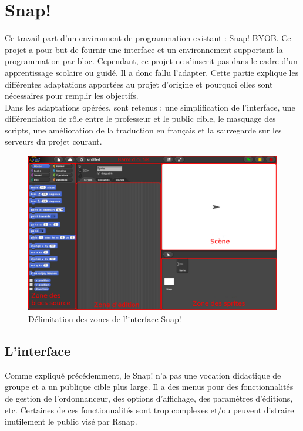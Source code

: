 \section{Snap!}
\label{solution SNAP}
Ce travail part d'un environnent de programmation existant : Snap! BYOB. Ce projet a pour but de fournir une interface et un environnement supportant la programmation par bloc. Cependant, ce projet ne s'inscrit pas dans le cadre d'un apprentissage scolaire ou guidé. Il a donc fallu l'adapter. Cette partie explique les différentes adaptations apportées au projet d'origine et pourquoi elles sont nécessaires pour remplir les objectifs.\\

Dans les adaptations opérées, sont retenus : une simplification de l'interface, une différenciation de rôle entre le professeur et le public cible, le masquage des scripts, une amélioration de la traduction en français et la sauvegarde sur les serveurs du projet courant.

\begin{figure}[]
  \begin{center}
  \includegraphics[width=\textwidth]{content/7-solution/2-snap/images/interface}
        \caption{Délimitation des zones de l'interface Snap!}
    \label{fig:snap interface}
  \end{center}
\end{figure}

\subsection{L'interface}
\label{interface}
Comme expliqué précédemment, le Snap! n'a pas une vocation didactique de groupe et a un publique cible plus large. Il a des menus pour des fonctionnalités de gestion de l'ordonnanceur, des options d'affichage, des paramètres d'éditions, etc. Certaines de ces fonctionnalités sont trop complexes et/ou peuvent distraire inutilement le public visé par Rsnap.

